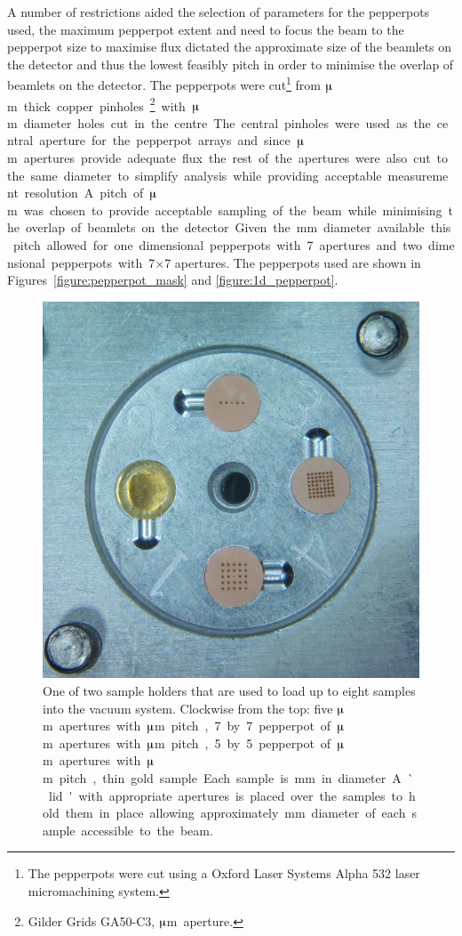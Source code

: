 A number of restrictions aided the selection of parameters for the pepperpots used, the maximum pepperpot extent and need to focus the beam to the pepperpot size to maximise flux dictated the approximate size of the beamlets on the detector and thus the lowest feasibly pitch in order to minimise the overlap of beamlets on the detector.
The pepperpots were cut\footnote{The pepperpots were cut using a Oxford Laser Systems Alpha 532 laser micromachining system.} from \unit[25]{$\muup$m} thick copper pinholes\footnote{Gilder Grids GA50-C3, \unit[50]{$\muup$m} aperture.} with \unit[50]{$\muup$m} diameter holes cut in the centre.
The central pinholes were used as the central aperture for the pepperpot arrays and since \unit[50]{$\muup$m} apertures provide adequate flux the rest of the apertures were also cut to the same diameter to simplify analysis while providing acceptable measurement resolution.
A pitch of \unit[200]{$\muup$m} was chosen to provide acceptable sampling of the beam while minimising the overlap of beamlets on the detector.
Given the \unit[2]{mm} diameter available this pitch allowed for one dimensional pepperpots with 7 apertures and two dimensional pepperpots with 7$\times$7 apertures.
The pepperpots used are shown in Figures~\ref{figure:pepperpot_mask} and \ref{figure:1d_pepperpot}.

\begin{figure}
    \center
    \includegraphics[width=0.49\linewidth]{part2/Figs/sample_holder.jpg}
    \caption{One of two sample holders that are used to load up to eight samples into the vacuum system. Clockwise from the top: five \unit[50]{$\muup$m} apertures with \unit[300]{$\muup$m} pitch, 7 by 7 pepperpot of \unit[50]{$\muup$m} apertures with \unit[200]{$\muup$m} pitch, 5 by 5 pepperpot of \unit[50]{$\muup$m} apertures with \unit[300]{$\muup$m} pitch, thin gold sample. Each sample is \unit[3]{mm} in diameter. A `lid' with appropriate apertures is placed over the samples to hold them in place allowing approximately \unit[2]{mm} diameter of each sample accessible to the beam.}
    \label{figure:sample_holder_pepperpots}
\end{figure}

